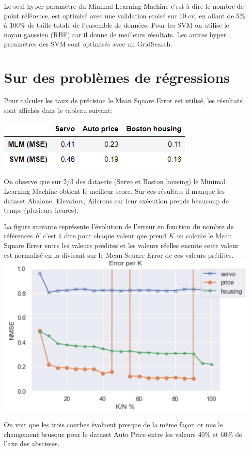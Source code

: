 \documentclass[12pt,a4paper]{report}
\begin{document}
\par Le seul hyper paramètre du Minimal Learning Machine c'est à dire le nombre de point référence, est optimisé avec une validation croisé sur 10 cv, en allant de 5\% à 100\% de taille totale de l'ensemble de données.
Pour les SVM on utilise le noyau gaussien (RBF) car il donne de meilleurs résultats. Les autres hyper paramètres des SVM sont optimisés avec un GridSearch.\\

{\color{MidnightBlue}\section{Sur des problèmes de régressions}}
\par Pour calculer les taux de précision le Mean Square Error est utilisé, les résultats sont affichés dans le tableau suivant:
\\\\\includegraphics[scale=0.99]{regr.png}
\par On observe que sur 2/3 des datasets (Servo et Boston housing) le Minimal Learning Machine obtient le meilleur score. Sur ces résultats il manque les dataset Abalone, Elevators, Ailerons car leur exécution prends beaucoup de temps (plusieurs heures).
\par La figure suivante représente l'évolution de l'erreur en fonction du nombre de références $K$ c'est à dire pour chaque valeur que prend $K$ on calcule le Mean Square Error entre les valeurs prédites et les valeurs réelles ensuite cette valeur est normalisé en la divisant sur le Mean Square Error de ces valeurs prédites.\\
\includegraphics[scale=0.99]{regr2.png}
\par On voit que les trois courbes évoluent presque de la même façon or mis le changement brusque pour le dataset Auto Price entre les valeurs 40\% et 60\% de l'axe des abscisses.
\end{document}

